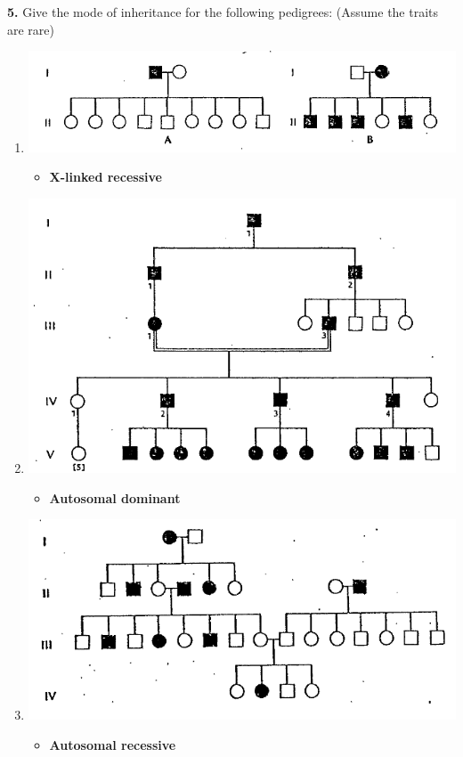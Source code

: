\documentclass[plain,basic]{inVerba-notes}
\begin{document}
    \textbf{5.} Give the mode of inheritance for the following pedigrees: (Assume the traits are rare)

    \begin{enumerate}[label=\textbf{\alph*}.]
        \item \includegraphics[scale=0.4]{images/pedigree-6.png}
            \begin{itemize}
                \item \textbf{X-linked recessive}
            \end{itemize}
        \item \includegraphics[scale=0.4]{images/pedigree-7.png}
            \begin{itemize}
                \item \textbf{Autosomal dominant}
            \end{itemize}
        \item \includegraphics[scale=0.4,angle=-0.5,origin=c]{images/pedigree-8.png}
            \begin{itemize}
                \item \textbf{Autosomal recessive}
            \end{itemize}
    \end{enumerate}
\end{document}
